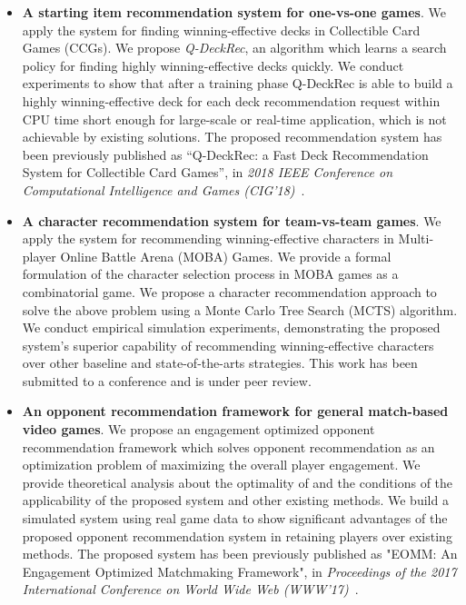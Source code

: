 \begin{itemize}
\item \textbf{A starting item recommendation system for one-vs-one games}. We apply the system for finding  winning-effective decks in Collectible Card Games (CCGs). We propose \textit{Q-DeckRec}, an algorithm which learns a
search policy for finding highly winning-effective decks quickly. We conduct experiments to show that after a training phase Q-DeckRec is
able to build a highly winning-effective deck for each deck recommendation request within CPU time short enough for large-scale or real-time application, which is not achievable by existing solutions. The proposed recommendation system has been previously published as ``Q-DeckRec: a Fast Deck Recommendation System for Collectible Card Games'', in \textit{2018 IEEE Conference on Computational Intelligence and Games (CIG'18)}~\cite{chenqdeckrec}.
\item \textbf{A character recommendation system for team-vs-team games}. We apply the system for recommending winning-effective characters in Multi-player Online Battle Arena (MOBA) Games. We provide a formal formulation of the character selection process in MOBA games as a combinatorial game. We propose a character recommendation approach to solve the above problem using a Monte Carlo Tree Search (MCTS) algorithm. We conduct empirical simulation experiments, demonstrating the proposed system's superior capability of recommending winning-effective characters over other baseline and state-of-the-arts strategies. This work has been submitted to a conference and is under peer review.
\item \textbf{An opponent recommendation framework for general match-based video games}. We
propose an engagement optimized opponent recommendation framework which solves opponent recommendation as an optimization problem of maximizing the overall player engagement. We provide theoretical analysis about the optimality of and the conditions of the applicability of the proposed system and other existing methods. We build a simulated system using real game data to show significant advantages of the proposed opponent recommendation system in retaining players over existing methods. The proposed system has been previously published as "EOMM: An Engagement Optimized Matchmaking Framework", in \textit{Proceedings of the 2017 International Conference on World Wide Web (WWW'17)}~\cite{chen2017eomm}.
\end{itemize}


